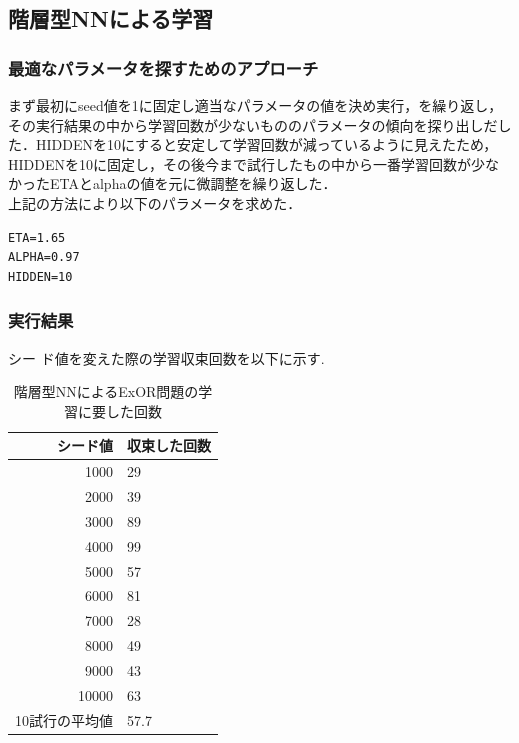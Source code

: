\subsection{階層型NNによる学習}
\subsubsection{最適なパラメータを探すためのアプローチ}

まず最初にseed値を1に固定し適当なパラメータの値を決め実行，を繰り返し，その実行結果の中から学習回数が少ないもののパラメータの傾向を探り出しだした．HIDDENを10にすると安定して学習回数が減っているように見えたため，HIDDENを10に固定し，その後今まで試行したもの中から一番学習回数が少なかったETAとalphaの値を元に微調整を繰り返した．\\
上記の方法により以下のパラメータを求めた．\\
\begin{verbatim}
ETA=1.65
ALPHA=0.97
HIDDEN=10
\end{verbatim}

\subsubsection{実行結果}

シー ド値を変えた際の学習収束回数を以下に示す.

\begin{table}[htb]
 \begin{center}
  \caption{階層型NNによるExOR問題の学習に要した回数}
  \label{table:level2}
  \begin{tabular}[htb]{r|l} \hline
   シード値 & 収束した回数 \\ \hline \hline
   1000 & 29 \\ \hline
   2000 & 39 \\ \hline
   3000 & 89 \\ \hline
   4000 & 99 \\ \hline
   5000 & 57 \\ \hline
   6000 & 81 \\ \hline
   7000 & 28 \\ \hline
   8000 & 49 \\ \hline
   9000 & 43 \\ \hline
   10000 & 63 \\ \hline \hline
   10試行の平均値 & 57.7 \\ \hline
  \end{tabular}
 \end{center}
\end{table}

